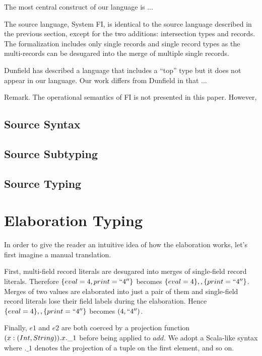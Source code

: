 \documentclass[preprint]{sigplanconf}
\begin{document}
The most central construct of our language is ...


The source language, System FI, is identical to the source language described in
the previous section, except for the two additions: intersection types and
records. The formalization includes only single records and single record types as the multi-records can be desugared into the merge of multiple single records.

Dunfield has described a language that includes a ``top'' type but it does not appear in our language. Our work differs from Dunfield in that ...

Remark. The operational semantics of FI is not presented in this paper. However,

\subsection{Source Syntax}

\subsection{Source Subtyping}

\subsection{Source Typing}

\section{Elaboration Typing}

In order to give the reader an intuitive idea of how the elaboration works,
let's first imagine a manual translation.

First, multi-field record literals are desugared into merges of single-field
record literals. Therefore $ \{ eval = 4, print = ``4'' \} $ becomes
$ \{ eval = 4 \} ,, \{ print = ``4'' \} $. Merges of two values are elaborated
into just a pair of them and single-field record literals lose their field
labels during the elaboration. Hence $ \{ eval = 4 \} ,, \{ print = ``4'' \} $
becomes $ (4, ``4'') $.

Finally, $ e1 $ and $ e2 $ are both coerced by a projection function
$ \\(x:(Int,String)). x.\_1 $ before being applied to $ add $. We adopt a
Scala-like syntax where $ .\_1 $ denotes the projection of a tuple on the first
element, and so on.
\end{document}
